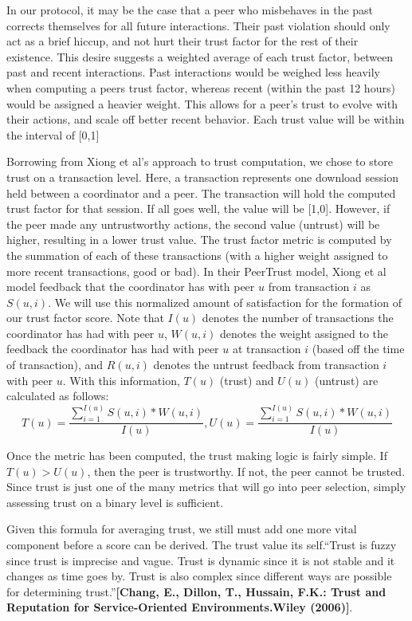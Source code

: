 \documentclass[12pt]{article}
\newcommand{\lcite}[1]
{{\bfseries\color{orange}[#1]}}
\begin{document}
			In our protocol, it may be the case that a peer who misbehaves in the past corrects themselves for all future interactions. Their past violation should only act as a brief hiccup, and not hurt their trust factor for the rest of their existence. This desire suggests a weighted average of each trust factor, between past and recent interactions. Past interactions would be weighed less heavily when computing a peers trust factor, whereas recent (within the past 12 hours) would be assigned a heavier weight. This allows for a peer's trust to evolve with their actions, and scale off better recent behavior. Each trust value will be within the interval of [0,1]

			Borrowing from Xiong et al's approach to trust computation, we chose to store trust on a transaction level. Here, a transaction represents one download session held between a coordinator and a peer. The transaction will hold the computed trust factor for that session. If all goes well, the value will be [1,0]. However, if the peer made any untrustworthy actions, the second value (untrust) will be higher, resulting in a lower trust value. The trust factor metric is computed by the summation of each of these transactions (with a higher weight assigned to more recent transactions, good or bad). In their PeerTrust model, Xiong et al model feedback that the coordinator has with peer $u$ from transaction $i$ as $S(u,i)$. We will use this normalized amount of satisfaction for the formation of our trust factor score. Note that $I(u)$ denotes the number of transactions the coordinator has had with peer $u$, $W(u,i)$ denotes the weight assigned to the feedback the coordinator has had with peer $u$ at transaction $i$ (based off the time of transaction), and $R(u,i)$ denotes the untrust feedback from transaction $i$ with peer $u$. With this information, $T(u)$ (trust) and $U(u)$ (untrust) are calculated as follows:
			$$
				T(u) = \frac{\sum\limits_{i=1}^{I(u)} S(u,i) * W(u,i)}{I(u)},
				U(u) = \frac{\sum\limits_{i=1}^{I(u)} S(u,i) * W(u,i)}{I(u)}
			$$

			Once the metric has been computed, the trust making logic is fairly simple. If $T(u) > U(u)$, then the peer is trustworthy. If not, the peer cannot be trusted. Since trust is just one of the many metrics that will go into peer selection, simply assessing trust on a binary level is sufficient. 

			Given this formula for averaging trust, we still must add one more vital component before a score can be derived. The trust value its self.``Trust is fuzzy since trust is imprecise and vague. Trust is dynamic since it is not stable and it changes as time goes by. Trust is also complex since different ways are possible for determining trust.''\lcite{Chang, E., Dillon, T., Hussain, F.K.: Trust and Reputation for Service-Oriented Environments.Wiley (2006)}. 
\end{document}
